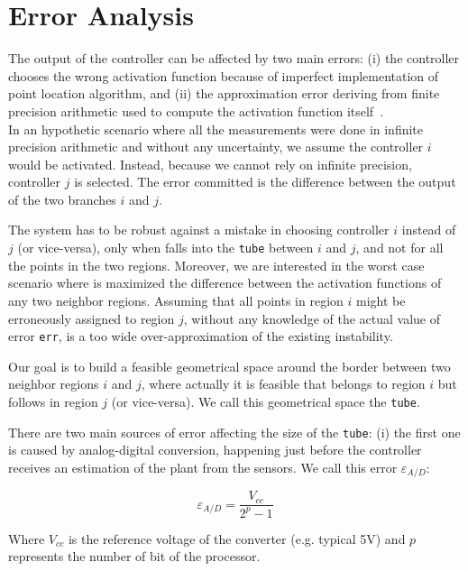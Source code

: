 \section{Error Analysis}
\label{sec:Error_Analysis}
The output of the controller can be affected by two main errors: (i) the controller chooses the wrong activation function because of imperfect implementation of point location algorithm, and (ii) the approximation error deriving from finite precision arithmetic used to compute the activation function itself~\cite{imperialrmpc}.\\
In an hypothetic scenario where all the measurements were done in infinite precision arithmetic and without any uncertainty, we assume the controller $i$ would be activated. Instead, because we cannot rely on infinite precision, controller $j$ is selected. The error committed is the difference between the output of the two branches $i$ and $j$.

The system has to be robust against a mistake in choosing controller $i$ instead of $j$ (or vice-versa), only when \qstatevarmath falls into the \texttt{tube} between $i$ and $j$, and not for all the points in the two regions. Moreover, we are interested in the worst case scenario where is maximized the difference between the activation functions of any two neighbor regions. Assuming that all points in region $i$ might be erroneously assigned to region $j$, without any  knowledge of the actual value of error \texttt{err}, is a too wide over-approximation of the existing instability. 

Our goal is to build a feasible geometrical space around the border between two neighbor regions $i$ and $j$, where actually it is feasible that \statevarmath belongs to region $i$ but \qstatevarmath follows in region $j$ (or vice-versa).
We call this geometrical space the \texttt{tube}.

There are two main sources of error affecting the size of the \texttt{tube}: (i) the first one is caused by analog-digital conversion, happening just before the controller receives an estimation of the plant from the sensors. We call this error $\varepsilon_{A/D}$: 

\begin{equation}\nonumber
\varepsilon_{A/D}=\frac{V_{cc}}{2^{p}-1}
\end{equation}

Where $V_{cc}$ is the reference voltage of the converter (e.g. typical 5V) and $p$ represents the number of bit of the processor.

